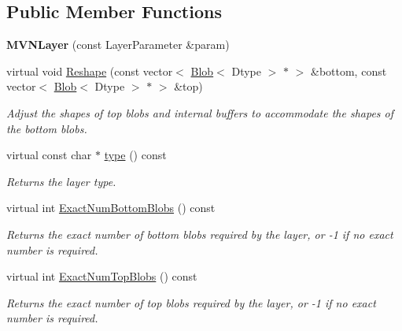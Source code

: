 \subsection*{Public Member Functions}
\begin{DoxyCompactItemize}
\item 
{\bfseries M\+V\+N\+Layer} (const Layer\+Parameter \&param)\hypertarget{classcaffe_1_1MVNLayer_aebec689ed713a68664980b03454e3506}{}\label{classcaffe_1_1MVNLayer_aebec689ed713a68664980b03454e3506}

\item 
virtual void \hyperlink{classcaffe_1_1MVNLayer_a732c936800d1b5c6594b81f917166ac3}{Reshape} (const vector$<$ \hyperlink{classcaffe_1_1Blob}{Blob}$<$ Dtype $>$ $\ast$ $>$ \&bottom, const vector$<$ \hyperlink{classcaffe_1_1Blob}{Blob}$<$ Dtype $>$ $\ast$ $>$ \&top)
\begin{DoxyCompactList}\small\item\em Adjust the shapes of top blobs and internal buffers to accommodate the shapes of the bottom blobs. \end{DoxyCompactList}\item 
virtual const char $\ast$ \hyperlink{classcaffe_1_1MVNLayer_a57b4150b70a0feddc54614fc31c06b48}{type} () const \hypertarget{classcaffe_1_1MVNLayer_a57b4150b70a0feddc54614fc31c06b48}{}\label{classcaffe_1_1MVNLayer_a57b4150b70a0feddc54614fc31c06b48}

\begin{DoxyCompactList}\small\item\em Returns the layer type. \end{DoxyCompactList}\item 
virtual int \hyperlink{classcaffe_1_1MVNLayer_a5766f86a41a05a585dfceeb944b6ca2c}{Exact\+Num\+Bottom\+Blobs} () const 
\begin{DoxyCompactList}\small\item\em Returns the exact number of bottom blobs required by the layer, or -\/1 if no exact number is required. \end{DoxyCompactList}\item 
virtual int \hyperlink{classcaffe_1_1MVNLayer_a0c5e5f3645dcc3b9dc5886cee9e6f302}{Exact\+Num\+Top\+Blobs} () const 
\begin{DoxyCompactList}\small\item\em Returns the exact number of top blobs required by the layer, or -\/1 if no exact number is required. \end{DoxyCompactList}\end{DoxyCompactItemize}
